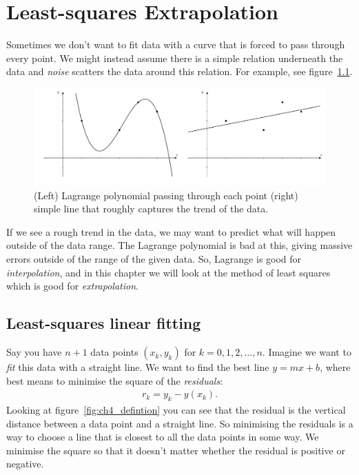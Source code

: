 \chapter{Least-squares Extrapolation} \label{ch:leastsquares}

Sometimes we don't want to fit data with a curve that is forced to pass through every point. We might instead assume there is a simple relation underneath the data and \textit{noise} scatters the data around this relation. For example, see figure~\ref{fig:ch4_purpose}.

\begin{figure}[H]
	\begin{center}
	\includegraphics[width=\textwidth]{figures/ch4_least_squares_purpose.pdf} 
	  \caption{(Left) Lagrange polynomial passing through each point (right) simple line that roughly captures the trend of the data.} \label{fig:ch4_purpose}
	\end{center}
\end{figure}

If we see a rough trend in the data, we may want to predict what will happen outside of the data range. The Lagrange polynomial is bad at this, giving massive errors outside of the range of the given data. So, Lagrange is good for \textit{interpolation}, and in this chapter we will look at the method of least squares which is good for \textit{extrapolation}.

\section{Least-squares linear fitting}
Say you have $n+1$ data points $(x_k,y_k)$ for $k=0,1,2,\dots,n$. Imagine we want to \textit{fit} this data with a straight line. We want to find the best line $y=mx + b$, where best means to minimise the square of the \textit{residuals}:
\begin{align*}
r_k = y_k - y(x_k).
\end{align*}
Looking at figure~\ref{fig:ch4_defintion} you can see that the residual is the vertical distance between a data point and a straight line. So minimising the residuals is a way to choose a line that is closest to all the data points in some way. We minimise the square so that it doesn't matter whether the residual is positive or negative.

